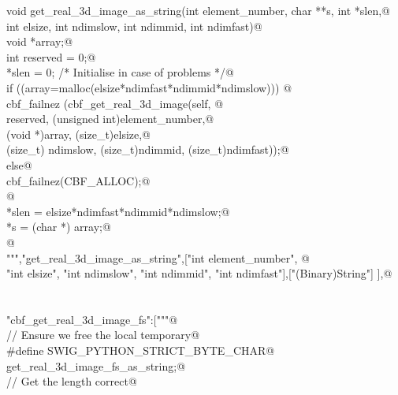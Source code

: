\documentclass[10pt,a4paper,twoside,notitlepage]{article}
\begin{document}
\begin{flushleft}
\begin{minipage}{\linewidth}
\begin{list}{}{}
\mbox{}\verb@    void get_real_3d_image_as_string(int element_number, char **s, int *slen,@\\
\mbox{}\verb@    int elsize, int ndimslow, int ndimmid, int ndimfast){@\\
\mbox{}\verb@        void *array;@\\
\mbox{}\verb@        int reserved = 0;@\\
\mbox{}\verb@        *slen = 0; /* Initialise in case of problems */@\\
\mbox{}\verb@        if ((array=malloc(elsize*ndimfast*ndimmid*ndimslow))) {@\\
\mbox{}\verb@               cbf_failnez (cbf_get_real_3d_image(self, @\\
\mbox{}\verb@               reserved, (unsigned int)element_number,@\\
\mbox{}\verb@               (void *)array, (size_t)elsize,@\\
\mbox{}\verb@               (size_t) ndimslow, (size_t)ndimmid, (size_t)ndimfast));@\\
\mbox{}\verb@         }else{@\\
\mbox{}\verb@               cbf_failnez(CBF_ALLOC);@\\
\mbox{}\verb@         }@\\
\mbox{}\verb@        *slen = elsize*ndimfast*ndimmid*ndimslow;@\\
\mbox{}\verb@        *s = (char *) array;@\\
\mbox{}\verb@      }@\\
\mbox{}\verb@""","get_real_3d_image_as_string",["int element_number", @\\
\mbox{}\verb@    "int elsize", "int ndimslow", "int ndimmid", "int ndimfast"],["(Binary)String"] ],@\\
\mbox{}\verb@@\\
\mbox{}\verb@@\\
\mbox{}\verb@"cbf_get_real_3d_image_fs":["""@\\
\mbox{}\verb@// Ensure we free the local temporary@\\
\mbox{}\verb@%{@\\
\mbox{}\verb@#define SWIG_PYTHON_STRICT_BYTE_CHAR@\\
\mbox{}\verb@%}@\\
\mbox{}\verb@%cstring_output_allocate_size(char ** s, int *slen, free(*$1))@\\
\mbox{}\verb@       get_real_3d_image_fs_as_string;@\\
\mbox{}\verb@// Get the length correct@\\

\end{list}
\end{minipage}
\end{flushleft}
\end{document}
